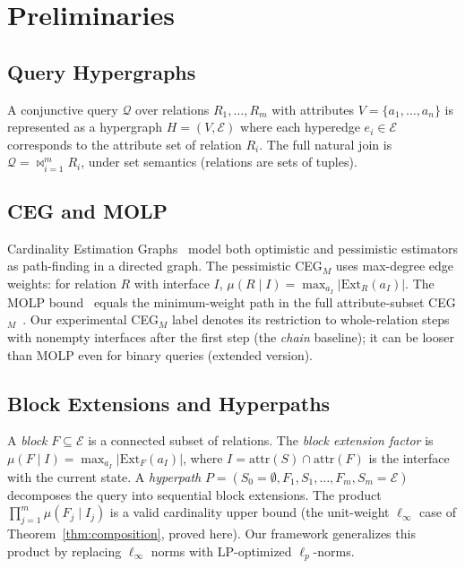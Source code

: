 \documentclass[conference]{IEEEtran}
\newcommand{\query}{\mathcal{Q}}
\newcommand{\rel}{R}
\newcommand{\block}{F}
\newcommand{\interface}{I}
\newcommand{\joinstate}{S}
\newcommand{\muFactor}[2]{\mu(#1 \mid #2)}
\newcommand{\ext}[2]{\text{Ext}_{#1}(#2)}
\newcommand{\attr}[1]{\text{attr}(#1)}
\begin{document}
\section{Preliminaries}
\label{sec:prelim}

\subsection{Query Hypergraphs}

A conjunctive query $\query$ over relations $\rel_1, \ldots, \rel_m$
with attributes $V = \{a_1, \ldots, a_n\}$ is represented as a
hypergraph $H = (V, \mathcal{E})$ where each hyperedge $e_i \in
\mathcal{E}$ corresponds to the attribute set of relation $\rel_i$.
The full natural join is $\query = \bowtie_{i=1}^{m} \rel_i$, under set semantics (relations are sets of tuples).

\subsection{CEG and MOLP}

Cardinality Estimation Graphs~\cite{chen2022ceg,salihoglu2026ceg} model
both optimistic and pessimistic estimators as path-finding in a directed
graph.
The pessimistic CEG$_M$ uses max-degree edge weights: for relation
$\rel$ with interface $\interface$,
$\muFactor{\rel}{\interface} = \max_{a_\interface}
|\ext{\rel}{a_\interface}|$.
The MOLP bound~\cite{joglekar2016molp} equals the minimum-weight path in the full attribute-subset CEG$_M$~\cite{chen2022ceg}. Our experimental CEG$_M$ label denotes its restriction to whole-relation steps with nonempty interfaces after the first step (the \emph{chain} baseline); it can be looser than MOLP even for binary queries (extended version).

\subsection{Block Extensions and Hyperpaths}\label{sec:blocks}

A \emph{block} $\block \subseteq \mathcal{E}$ is a connected subset
of relations.
The \emph{block extension factor} is
$\muFactor{\block}{\interface} = \max_{a_\interface}
|\ext{\block}{a_\interface}|$,
where $\interface = \attr{\joinstate} \cap \attr{\block}$ is the
interface with the current state.
A \emph{hyperpath} $P = (\joinstate_0{=}\emptyset, \block_1,
\joinstate_1, \ldots, \block_m, \joinstate_m{=}\mathcal{E})$
decomposes the query into sequential block extensions.
The product $\prod_{j=1}^{m} \muFactor{\block_j}{\interface_j}$ is
a valid cardinality upper bound (the unit-weight $\ell_\infty$ case of Theorem~\ref{thm:composition}, proved here).
Our framework generalizes this product by replacing $\ell_\infty$
norms with LP-optimized $\ell_p$-norms.
\end{document}

